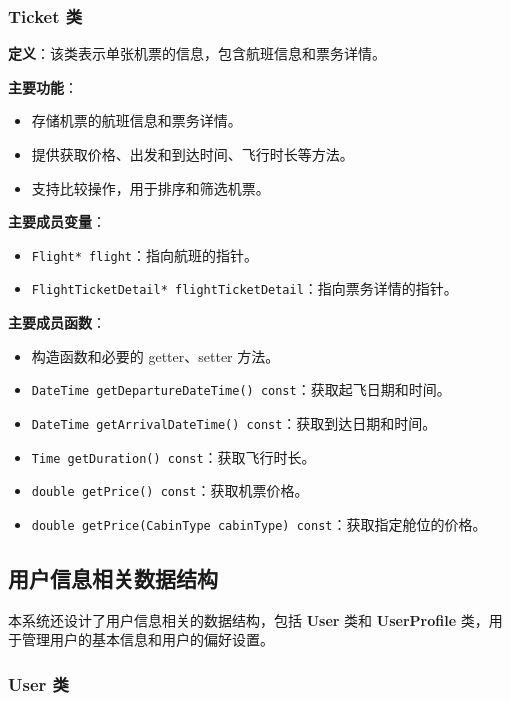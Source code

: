 \documentclass[UTF8, a4paper,12pt]{ctexart}
\begin{document}
\subsubsection{Ticket 类}

\textbf{定义}：该类表示单张机票的信息，包含航班信息和票务详情。

\textbf{主要功能}：

\begin{itemize}
    \item 存储机票的航班信息和票务详情。
    \item 提供获取价格、出发和到达时间、飞行时长等方法。
    \item 支持比较操作，用于排序和筛选机票。
\end{itemize}

\textbf{主要成员变量}：

\begin{itemize}
    \item \texttt{Flight* flight}：指向航班的指针。
    \item \texttt{FlightTicketDetail* flightTicketDetail}：指向票务详情的指针。
\end{itemize}

\textbf{主要成员函数}：

\begin{itemize}
    \item 构造函数和必要的 getter、setter 方法。
    \item \texttt{DateTime getDepartureDateTime() const}：获取起飞日期和时间。
    \item \texttt{DateTime getArrivalDateTime() const}：获取到达日期和时间。
    \item \texttt{Time getDuration() const}：获取飞行时长。
    \item \texttt{double getPrice() const}：获取机票价格。
    \item \texttt{double getPrice(CabinType cabinType) const}：获取指定舱位的价格。
\end{itemize}


\subsection{用户信息相关数据结构}

本系统还设计了用户信息相关的数据结构，包括 \textbf{User} 类和 \textbf{UserProfile} 类，用于管理用户的基本信息和用户的偏好设置。

\subsubsection{User 类}
\end{document}
